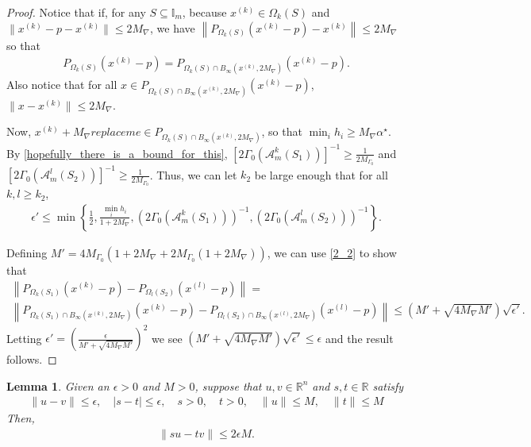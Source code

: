 \documentclass{article}
\newtheorem{lemma}[theorem]{Lemma}
\theoremstyle{case}
\numberwithin{theorem}{subsection}
\newcommand{\huff}{{\Gamma_0}}
\newcommand{\maxgrad}{{M_{\nabla}}}
\newcommand{\minanglealpha}{{ \alpha^{\star} }}
\newcommand{\reals}{\mathbb R}
\newcommand{\Rn}{\mathbb R^n}
\newcommand{\xk}{{x^{(k)}}}
\newcommand{\minangleu}{{replace me}}
\begin{document}
\begin{proof}
Notice that if, for any $S \subseteq \mathbb I_m$,
because $\xk \in \Omega_k(S)$ and $\|\xk - p - \xk\| \le 2\maxgrad $, we have
$\left\|P_{\Omega_k(S)}\left(\xk - p \right) - \xk \right\| \le 2\maxgrad$
so that 
\begin{align*}
P_{\Omega_k(S)                 							  }\left(\xk - p \right) = 
P_{\Omega_k(S) \cap B_{\infty}\left(\xk, 2\maxgrad\right) }\left(\xk - p\right).
\end{align*}
Also notice that for all $x \in P_{\Omega_k(S) \cap B_{\infty}\left(\xk, 2\maxgrad\right) }\left(\xk - p\right)$,
$\|x - \xk\| \le 2\maxgrad$.

Now, $\xk + \maxgrad \minangleu \in P_{\Omega_k(S) \cap B_{\infty}\left(\xk, 2\maxgrad\right) }$,
so that $\min_i h_i \ge \maxgrad \minanglealpha$.
By \cref{hopefully_there_is_a_bound_for_this},
$\left[2\huff\left(\mathcal A^k_m\left(S_1\right)\right)\right]^{-1} \ge \frac 1 {2M_{\Gamma_0}}$ and
$\left[2\huff\left(\mathcal A^l_m\left(S_2\right)\right)\right]^{-1} \ge \frac 1 {2M_{\Gamma_0}}$.
Thus, we can let $k_2$ be large enough that for all $k, l \ge k_2$,
\begin{align*}
\epsilon' \le \min\left\{
\frac 1 2,
\frac{\min_i h_i}{1 + 2\maxgrad},
\left(2\huff\left(\mathcal A^k_m\left(S_1\right)\right)\right)^{-1},
\left(2\huff\left(\mathcal A^l_m\left(S_2\right)\right)\right)^{-1}\right\}.
\end{align*}

Defining $M' = 4M_{\Gamma_0}\left(1 + 2\maxgrad + 2M_{\Gamma_0}\left(1 + 2\maxgrad\right)\right)$, 
we can use \cref{2_2} to show that
\begin{align*}
\left\| 
  P_{\Omega_k(S_1)}\left(\xk - p\right) - P_{\Omega_l(S_2)}\left(x^{(l)} - p \right)
\right\| = \\
\left\| 
  P_{\Omega_k(S_1) \cap B_{\infty}\left(\xk, 2\maxgrad\right)}\left(\xk - p\right) - P_{\Omega_l(S_2) \cap B_{\infty}\left(x^{(l)}, 2\maxgrad\right)}\left(x^{(l)} - p \right)
\right\| \le \left( M' + \sqrt{4\maxgrad M'}\right)\sqrt{\epsilon'}.
\end{align*}
Letting 
$\epsilon' = \left(\frac{\epsilon}{ M' + \sqrt{4\maxgrad M'}}\right)^2$
we see
$ \left( M' + \sqrt{4\maxgrad M'}\right)\sqrt{\epsilon'} \le \epsilon$
and the result follows.
\end{proof}






\begin{lemma}
\label{the_simple_bound_one}
Given an $\epsilon > 0$ and $M > 0$, suppose that $u,v \in \Rn$ and $s,t \in \reals$ satisfy
\begin{align}
\|u - v \| \le \epsilon, \quad
|s - t | \le \epsilon, \quad
s > 0, \quad
t > 0, \quad
\|u\| \le M, \quad
\|t\| \le M
\end{align}
Then,
\begin{align}
\bigg\|su - tv\bigg\| \le 2\epsilon M.
\end{align}
\end{lemma}
\end{document}

